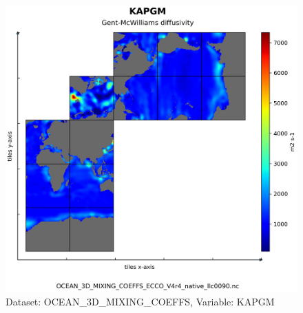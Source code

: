 \begin{figure}[H]
\centering
\includegraphics[scale=0.55]{../images/plots/native_plots/Ocean_3D_Gent-Mcwilliams_Redi_and_Background_Vertical_Diffusivity_Coefficients_for_the_Lat-Lon-Cap_90_(llc90)_Native_Model_Grid_(Version_4_Release_4)/KAPGM.png}
\caption{Dataset: OCEAN\_3D\_MIXING\_COEFFS, Variable: KAPGM}
\label{tab:table-OCEAN_3D_MIXING_COEFFS_KAPGM-Plot}
\end{figure}
\pagebreak
